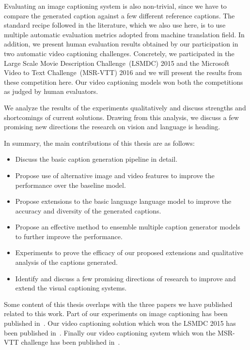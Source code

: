 Evaluating an image captioning system is also non-trivial, since we have to
compare the generated caption against a few different reference captions.
The standard recipe followed in the literature, which we also use here, is to
use multiple automatic evaluation metrics adopted from machine translation
field. 
In addition, we present human evaluation results obtained by our participation
in two automatic video captioning challenges.
Concretely, we participated in the  Large Scale Movie Description
Challenge~(LSMDC) 2015 and the Microsoft Video to Text Challenge~(MSR-VTT) 2016
and we will present the results from these competition here.
Our video captioning models won both the competitions as judged by human
evaluators.

We analyze the results of the experiments qualitatively and discuss strengths
and shortcomings of current solutions. 
Drawing from this analysis, we discuss a few promising new directions the
research on vision and language is heading.

In summary, the main contributions of this thesis are as follows:
\begin{itemize}
  \item Discuss the basic caption generation pipeline in detail. 
  \item Propose use of alternative image and video features to improve the
          performance over the baseline model.
  \item Propose extensions to the basic language language model to improve the
          accuracy and diversity of the generated captions.
  \item Propose an effective method to ensemble multiple caption generator
          models to further improve the performance.
  \item Experiments to prove the efficacy of our proposed extensions and qualitative
          analysis of the captions generated.
  \item Identify and discuss a few promising directions of research to improve
          and extend the visual captioning systems.
       
\end{itemize}

Some content of this thesis overlaps with the three papers we have published
related to this work.
Part of our experiments on image captioning has been published
in~\cite{ShettyACMMM2016Wrk}.
Our video captioning solution which won the LSMDC 2015 has been published
in~\cite{shetty2015video}.
Finally our video captioning system which won the MSR-VTT challenge has been
published in~\cite{ShettyACMMM2016}.
